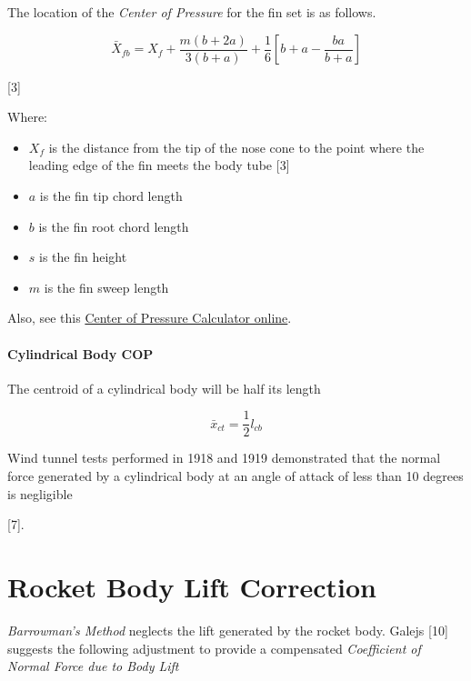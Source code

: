 \documentclass[]{book}
\providecommand{\tightlist}{%
  \setlength{\itemsep}{0pt}\setlength{\parskip}{0pt}}
\let\oldparagraph\paragraph
\renewcommand{\paragraph}[1]{\oldparagraph{#1}\mbox{}}
\begin{document}
The location of the \emph{Center of Pressure} for the fin set is as
follows.

\begin{equation}
\label{eq_cop_fin_set}
\bar{X}_{fb}
= 
X_f 
+ 
\dfrac {m ( b + 2 a )} {3 ( b + a ) } 
+ \dfrac{1}{6} 
\left[ b + a - \dfrac{b a}{b + a} \right]
\end{equation}

{[}3{]}

Where:

\begin{itemize}
\tightlist
\item
  \(X_f\) is the distance from the tip of the nose cone to the point
  where the leading edge of the fin meets the body tube {[}3{]}
\item
  \(a\) is the fin tip chord length
\item
  \(b\) is the fin root chord length
\item
  \(s\) is the fin height
\item
  \(m\) is the fin sweep length
\end{itemize}

Also, see this
\href{http://physics.gallaudet.edu/tools/rocketcop.html}{Center of
Pressure Calculator online}.

\paragraph{Cylindrical Body COP}\label{cylindrical-body-cop}

The centroid of a cylindrical body will be half its length

\begin{equation}
\label{eq_centroid_bodytube}
\bar{x}_{ct} = \dfrac{1}{2} l_{cb}
\end{equation}

Wind tunnel tests performed in 1918 and 1919 demonstrated that the
normal force generated by a cylindrical body at an angle of attack of
less than 10 degrees is negligible

{[}7{]}.

\section{Rocket Body Lift Correction}\label{rocket-body-lift-correction}

\emph{Barrowman's Method} neglects the lift generated by the rocket
body. Galejs {[}10{]} suggests the following adjustment to provide a
compensated \emph{Coefficient of Normal Force due to Body Lift}
\end{document}
